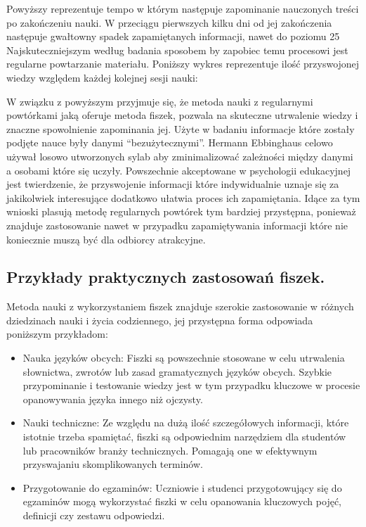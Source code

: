 Powyższy reprezentuje tempo w którym następuje zapominanie nauczonych treści po zakończeniu nauki. W przeciągu pierwszych kilku dni od jej zakończenia następuje gwałtowny spadek zapamiętanych informacji, nawet do poziomu 25%
Najskuteczniejszym według badania sposobem by zapobiec temu procesowi jest regularne powtarzanie materiału. Poniższy wykres reprezentuje ilość przyswojonej wiedzy względem każdej kolejnej sesji nauki:

W związku z powyższym przyjmuje się, że metoda nauki z regularnymi powtórkami jaką oferuje metoda fiszek, pozwala na skuteczne utrwalenie wiedzy i znaczne spowolnienie zapominania jej.
Użyte w badaniu informacje które zostały podjęte nauce były danymi “bezużytecznymi”. Hermann Ebbinghaus celowo używał losowo utworzonych sylab aby zminimalizować zależności między danymi a osobami które się uczyły. Powszechnie akceptowane w psychologii edukacyjnej jest twierdzenie, że przyswojenie informacji które indywidualnie uznaje się za jakikolwiek interesujące dodatkowo ułatwia proces ich zapamiętania. Idące za tym wnioski plasują metodę regularnych powtórek tym bardziej przystępna, ponieważ znajduje zastosowanie nawet w przypadku zapamiętywania informacji które nie koniecznie muszą być dla odbiorcy atrakcyjne.

\subsection{Przykłady praktycznych zastosowań fiszek.}

Metoda nauki z wykorzystaniem fiszek znajduje szerokie zastosowanie w różnych dziedzinach nauki i życia codziennego, jej przystępna forma odpowiada poniższym przykładom:
\begin{itemize}
    \item Nauka języków obcych: Fiszki są powszechnie stosowane w celu utrwalenia słownictwa, zwrotów lub zasad gramatycznych języków obcych. Szybkie przypominanie i testowanie wiedzy jest w tym przypadku kluczowe w procesie opanowywania języka innego niż ojczysty.
    \item Nauki techniczne: Ze względu na dużą ilość szczegółowych informacji, które istotnie trzeba spamiętać, fiszki są odpowiednim narzędziem dla studentów lub pracowników branży technicznych. Pomagają one w efektywnym przyswajaniu skomplikowanych terminów.
    \item Przygotowanie do egzaminów: Uczniowie i studenci przygotowujący się do egzaminów mogą wykorzystać fiszki w celu opanowania kluczowych pojęć, definicji czy zestawu odpowiedzi.
\end{itemize}

